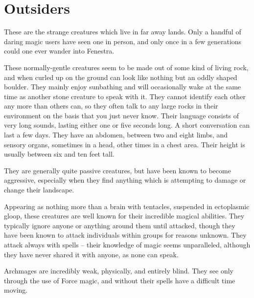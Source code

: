 \section{Outsiders}

\begin{multicols}{2}

\noindent
These are the strange creatures which live in far away lands.  Only a handful of daring magic users have seen one in person, and only once in a few generations could one ever wander into Fenestra.

\label{rockman}

These normally-gentle creatures seem to be made out of some kind of living rock, and when curled up on the ground can look like nothing but an oddly shaped boulder.
They mainly enjoy sunbathing and will occasionally wake at the same time as another stone creature to speak with it.
They cannot identify each other any more than others can, so they often talk to any large rocks in their environment on the basis that you just never know.
Their language consists of very long sounds, lasting either one or five seconds long.
A short conversation can last a few days.
They have an abdomen, between two and eight limbs, and sensory organs, sometimes in a head, other times in a chest area.
Their height is usually between six and ten feet tall.

They are generally quite passive creatures, but have been known to become aggressive, especially when they find anything which is attempting to damage or change their landscape.

\rockman


\label{archmage}

Appearing as nothing more than a brain with tentacles, suspended in ectoplasmic gloop, these creatures are well known for their incredible magical abilities.
They typically ignore anyone or anything around them until attacked, though they have been known to attack individuals within groups for reasons unknown.
They attack always with spells -- their knowledge of magic seems unparalleled, although they have never shared it with anyone, as none can speak.

Archmages are incredibly weak, physically, and entirely blind.
They see only through the use of Force magic, and without their spells have a difficult time moving.

\archmage


\end{multicols}
